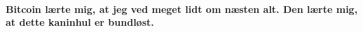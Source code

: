 \paragraph{Bitcoin lærte mig, at jeg ved meget lidt om næsten alt. Den lærte mig, at dette kaninhul er bundløst.}

%
%
%
%
%
